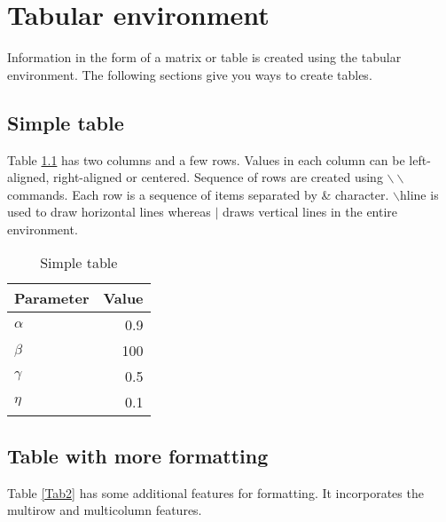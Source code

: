 \chapter{Tabular environment}
\graphicspath{{Chapter4/Chapter4Figs/EPS/}{Chapter4/Chapter4Figs/}}

%
Information in the form of a matrix or table is created using the tabular environment. The following sections give you ways to create tables. 

\section{Simple table}

Table \ref{Tab1} has two columns and a few rows. Values in each column can be left-aligned, right-aligned or centered. Sequence of rows are created using $\backslash\backslash$ commands. Each row is a sequence of items separated by \& character. $\backslash$hline is used to draw horizontal lines whereas $|$ draws vertical lines in the entire environment. 

\begin{table}
\caption{\label{Tab1}Simple table}
\begin{center}
\begin{tabular}{|l|r|} \hline
Parameter         & Value      \\ \hline \hline
$\alpha$          & 0.9        \\ \hline
$\beta$           & 100        \\ \hline
$\gamma$          & 0.5        \\ \hline
$\eta$            & 0.1        \\ \hline
\end{tabular}
\end{center}
\end{table}

\section{Table with more formatting}

Table \ref{Tab2} has some additional features for formatting. It incorporates the multirow and multicolumn features. 

